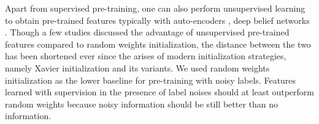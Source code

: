 


Apart from supervised pre-training, one can also perform unsupervised learning to obtain pre-trained features typically with auto-encoders \cite{vincent2010stacked,masci2011stacked}, deep belief networks \cite{hinton2006fast,lee2009convolutional}.
Though a few studies \cite{erhan2009difficulty,erhan2010does,bengio2012deep} discussed the advantage of unsupervised pre-trained features compared to random weights initialization, the distance between the two has been shortened ever since the arises of modern initialization strategies, namely Xavier initialization \cite{glorot2010understanding} and its variants.
We used random weights initialization as the lower baseline for pre-training with noisy labels.
Features learned with supervision in the presence of label noises should at least outperform random weights because noisy information should be still better than no information.

